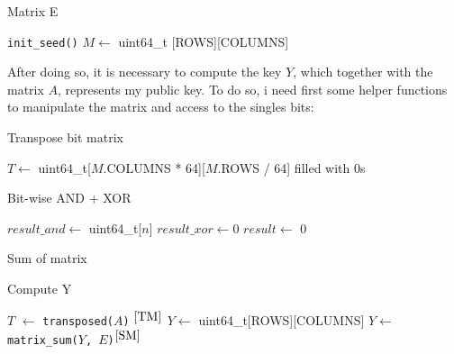 \begin{algorithm}[H]
\DontPrintSemicolon
\caption{Matrix E\label{GE}}
\texttt{init\_seed()}\;
$M \leftarrow$ uint64\_t [ROWS][COLUMNS]\;
\;
\end{algorithm}

After doing so, it is necessary to compute the key \(Y\), which together with the matrix \(A\), represents my public key. To do so, i need first some helper functions to manipulate the matrix and access to the singles bits:

\begin{algorithm}[H]
\DontPrintSemicolon
\caption{Transpose bit matrix \label{TM}}
$T \leftarrow$ uint64\_t[$M$.COLUMNS * 64][$M$.ROWS / 64] filled with 0s\;
\;
\end{algorithm}

\begin{algorithm}[H]
\DontPrintSemicolon
\caption{Bit-wise AND + XOR \label{BAX}}
$result\_and \leftarrow$ uint64\_t[$n$]\;
$result\_xor \leftarrow 0$\;
$result \leftarrow$ 0\;
\;
\end{algorithm}

\begin{algorithm}[H]
\DontPrintSemicolon
\caption{Sum of matrix \label{SM}}
\end{algorithm}

\begin{algorithm}[H]
\DontPrintSemicolon
\caption{Compute Y \label{CY}} 
$T$ $\leftarrow$ \texttt{transposed($A$)} $^{\ref{TM}}$\;
$Y \leftarrow$ uint64\_t[ROWS][COLUMNS]\;
$Y \leftarrow$ \texttt{matrix\_sum($Y$, $E$)$^{\ref{SM}}$}\;
\end{algorithm}

